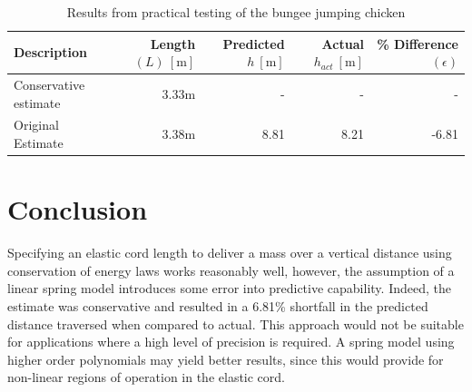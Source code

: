 \documentclass[a4paper]{article}
\begin{document}
\begin{table}[h]
	\centering
	\caption{Results from practical testing of the bungee jumping chicken}
	\begin{tabular}{lrrrr}
		\toprule
		Description & Length $(L) \ [\si{\meter}]$ & Predicted $h \  [\si{\meter}]$ & Actual $h_{act} \ [\si{\meter}]$ & \% Difference $(\epsilon)$\\
		\midrule
		Conservative estimate & 3.33$\si{\meter}$ & - & - & - \\
		Original Estimate & 3.38$\si{\meter}$ & 8.81 & 8.21 & -6.81 \\
		\bottomrule
	\end{tabular}
\end{table}

\section{Conclusion}
Specifying an elastic cord length to deliver a mass over a vertical distance using conservation of energy laws works reasonably well, however, the assumption of a linear spring model introduces some error into predictive capability. Indeed, the estimate was conservative and resulted in a 6.81\% shortfall in the predicted distance traversed when compared to actual. This approach would not be suitable for applications where a high level of precision is required. A spring model using higher order polynomials may yield better results, since this would provide for non-linear regions of operation in the elastic cord. 



\end{document}
